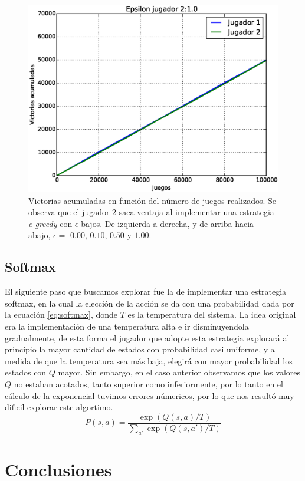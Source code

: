 \documentclass[11pt, spanish]{article}
\begin{document}
\begin{figure}
\includegraphics[scale = 0.3]{figuras/Epsilon10.eps}
\caption{Victorias acumuladas en función del número de juegos realizados. Se observa que el jugador 2 saca ventaja al implementar una estrategia \emph{e-greedy} con $\epsilon$ bajos. De izquierda a derecha, y de arriba hacia abajo, $\epsilon = $ $0.00$, $0.10$, $0.50$ y $1.00$.}
\label{fig:e_greedy}
\end{figure}

\subsection{Softmax}
\par El siguiente paso que buscamos explorar fue la de implementar una estrategia softmax, en la cual la elección de la acción se da con una probabilidad dada por la ecuación \ref{eq:softmax}, donde $T$ es la temperatura del sistema. La idea original era la implementación de una temperatura alta e ir disminuyendola gradualmente, de esta forma el jugador que adopte esta estrategia explorará al principio la mayor cantidad de estados con probabilidad casi uniforme, y a medida de que la temperatura sea más baja, elegirá con mayor probabilidad los estados con $Q$ mayor. Sin embargo, en el caso anterior observamos que los valores $Q$ no estaban acotados, tanto superior como inferiormente, por lo tanto en el cálculo de la exponencial tuvimos errores númericos, por lo que nos resultó muy dificil explorar este algortimo.
\begin{equation}
P(s,a) = \frac{\exp(Q(s,a)/T)}{\sum_{a'}{\exp(Q(s,a')/T)}}
\label{eq:softmax}
\end{equation}

\section{Conclusiones}
\end{document}
